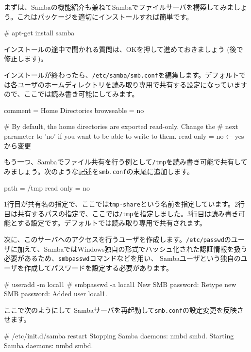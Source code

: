\documentclass[mingoth,a4paper]{jsarticle}
\begin{document}
まずは、Sambaの機能紹介も兼ねてSambaでファイルサーバを構築してみましょう。これはパッケージを適切にインストールすれば簡単です。

\begin{commandline}
# apt-get install samba
\end{commandline}

インストールの途中で聞かれる質問は、OKを押して進めておきましょう (後で修正します)。

インストールが終わったら、{\tt{/etc/samba/smb.conf}}を編集します。デフォルトでは各ユーザのホームディレクトリを読み取り専用で共有する設定になっていますので、ここでは読み書き可能にしてみます。

\begin{commandline}
[homes]
   comment = Home Directories
   browseable = no

# By default, the home directories are exported read-only. Change the
# next parameter to 'no' if you want to be able to write to them.
   read only = no ← yesから変更
\end{commandline}

もう一つ、Sambaでファイル共有を行う例として{\tt{/tmp}}を読み書き可能で共有してみましょう。次のような記述を{\tt{smb.conf}}の末尾に追加します。

\begin{commandline}
  path = /tmp
  read only = no
\end{commandline}

1行目が共有名の指定で、ここでは{\tt{tmp-share}}という名前を指定しています。2行目は共有するパスの指定で、ここでは{\tt{/tmp}}を指定しました。3行目は読み書き可能とする設定です。デフォルトでは読み取り専用で共有されます。

次に、このサーバへのアクセスを行うユーザを作成します。{\tt{/etc/passwd}}のユーザに加えて、SambaではWindows独自の形式でハッシュ化された認証情報を扱う必要があるため、{\tt{smbpasswd}}コマンドなどを用い、 Sambaユーザという独自のユーザを作成してパスワードを設定する必要があります。

\begin{commandline}
# useradd -m local1
# smbpasswd -a local1
New SMB password:
Retype new SMB password:
Added user local1.
\end{commandline}

ここで次のようにして Sambaサーバを再起動して{\tt{smb.conf}}の設定変更を反映させます。

\begin{commandline}
# /etc/init.d/samba restart
Stopping Samba daemons: nmbd smbd.
Starting Samba daemons: nmbd smbd.
\end{commandline}
\end{document}
